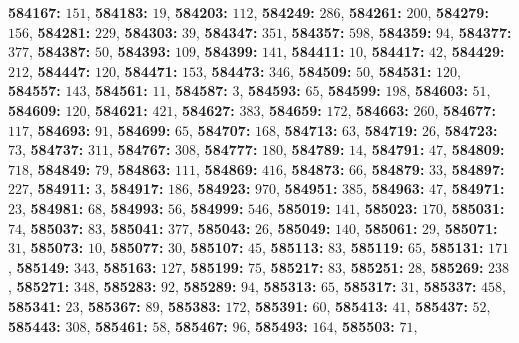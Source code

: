 \textsf{\bfseries 584167:} $151$, \textsf{\bfseries 584183:} $19$, \textsf{\bfseries 584203:} $112$, \textsf{\bfseries 584249:} $286$, \textsf{\bfseries 584261:} $200$, \textsf{\bfseries 584279:} $156$, \textsf{\bfseries 584281:} $229$, \textsf{\bfseries 584303:} $39$, \textsf{\bfseries 584347:} $351$, \textsf{\bfseries 584357:} $598$, \textsf{\bfseries 584359:} $94$, \textsf{\bfseries 584377:} $377$, \textsf{\bfseries 584387:} $50$, \textsf{\bfseries 584393:} $109$, \textsf{\bfseries 584399:} $141$, \textsf{\bfseries 584411:} $10$, \textsf{\bfseries 584417:} $42$, \textsf{\bfseries 584429:} $212$, \textsf{\bfseries 584447:} $120$, \textsf{\bfseries 584471:} $153$, \textsf{\bfseries 584473:} $346$, \textsf{\bfseries 584509:} $50$, \textsf{\bfseries 584531:} $120$, \textsf{\bfseries 584557:} $143$, \textsf{\bfseries 584561:} $11$, \textsf{\bfseries 584587:} $3$, \textsf{\bfseries 584593:} $65$, \textsf{\bfseries 584599:} $198$, \textsf{\bfseries 584603:} $51$, \textsf{\bfseries 584609:} $120$, \textsf{\bfseries 584621:} $421$, \textsf{\bfseries 584627:} $383$, \textsf{\bfseries 584659:} $172$, \textsf{\bfseries 584663:} $260$, \textsf{\bfseries 584677:} $117$, \textsf{\bfseries 584693:} $91$, \textsf{\bfseries 584699:} $65$, \textsf{\bfseries 584707:} $168$, \textsf{\bfseries 584713:} $63$, \textsf{\bfseries 584719:} $26$, \textsf{\bfseries 584723:} $73$, \textsf{\bfseries 584737:} $311$, \textsf{\bfseries 584767:} $308$, \textsf{\bfseries 584777:} $180$, \textsf{\bfseries 584789:} $14$, \textsf{\bfseries 584791:} $47$, \textsf{\bfseries 584809:} $718$, \textsf{\bfseries 584849:} $79$, \textsf{\bfseries 584863:} $111$, \textsf{\bfseries 584869:} $416$, \textsf{\bfseries 584873:} $66$, \textsf{\bfseries 584879:} $33$, \textsf{\bfseries 584897:} $227$, \textsf{\bfseries 584911:} $3$, \textsf{\bfseries 584917:} $186$, \textsf{\bfseries 584923:} $970$, \textsf{\bfseries 584951:} $385$, \textsf{\bfseries 584963:} $47$, \textsf{\bfseries 584971:} $23$, \textsf{\bfseries 584981:} $68$, \textsf{\bfseries 584993:} $56$, \textsf{\bfseries 584999:} $546$, \textsf{\bfseries 585019:} $141$, \textsf{\bfseries 585023:} $170$, \textsf{\bfseries 585031:} $74$, \textsf{\bfseries 585037:} $83$, \textsf{\bfseries 585041:} $377$, \textsf{\bfseries 585043:} $26$, \textsf{\bfseries 585049:} $140$, \textsf{\bfseries 585061:} $29$, \textsf{\bfseries 585071:} $31$, \textsf{\bfseries 585073:} $10$, \textsf{\bfseries 585077:} $30$, \textsf{\bfseries 585107:} $45$, \textsf{\bfseries 585113:} $83$, \textsf{\bfseries 585119:} $65$, \textsf{\bfseries 585131:} $171$, \textsf{\bfseries 585149:} $343$, \textsf{\bfseries 585163:} $127$, \textsf{\bfseries 585199:} $75$, \textsf{\bfseries 585217:} $83$, \textsf{\bfseries 585251:} $28$, \textsf{\bfseries 585269:} $238$, \textsf{\bfseries 585271:} $348$, \textsf{\bfseries 585283:} $92$, \textsf{\bfseries 585289:} $94$, \textsf{\bfseries 585313:} $65$, \textsf{\bfseries 585317:} $31$, \textsf{\bfseries 585337:} $458$, \textsf{\bfseries 585341:} $23$, \textsf{\bfseries 585367:} $89$, \textsf{\bfseries 585383:} $172$, \textsf{\bfseries 585391:} $60$, \textsf{\bfseries 585413:} $41$, \textsf{\bfseries 585437:} $52$, \textsf{\bfseries 585443:} $308$, \textsf{\bfseries 585461:} $58$, \textsf{\bfseries 585467:} $96$, \textsf{\bfseries 585493:} $164$, \textsf{\bfseries 585503:} $71$, 
